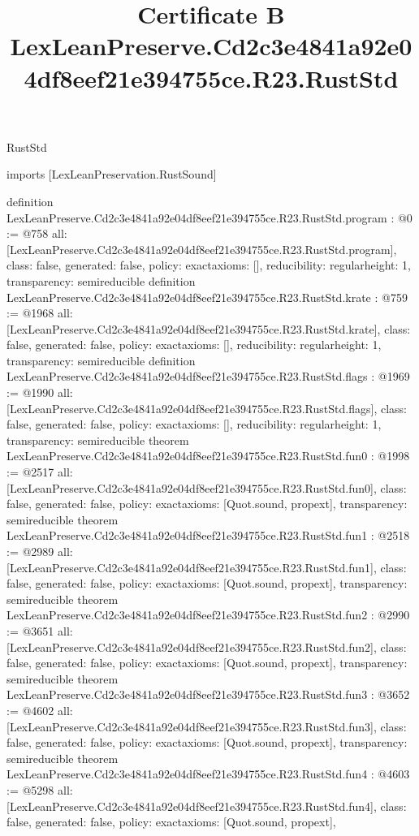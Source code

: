 \begin{lexlean}{RustStd}
\title{Certificate B LexLeanPreserve.Cd2c3e4841a92e04df8eef21e394755ce.R23.RustStd}
\begin{coremodule}
imports [LexLeanPreservation.RustSound]

definition LexLeanPreserve.Cd2c3e4841a92e04df8eef21e394755ce.R23.RustStd.program : @0 := @758 {
  all: [LexLeanPreserve.Cd2c3e4841a92e04df8eef21e394755ce.R23.RustStd.program],
  class: false,
  generated: false,
  policy: exact{axioms: []},
  reducibility: regular{height: 1},
  transparency: semireducible
}
definition LexLeanPreserve.Cd2c3e4841a92e04df8eef21e394755ce.R23.RustStd.krate : @759 := @1968 {
  all: [LexLeanPreserve.Cd2c3e4841a92e04df8eef21e394755ce.R23.RustStd.krate],
  class: false,
  generated: false,
  policy: exact{axioms: []},
  reducibility: regular{height: 1},
  transparency: semireducible
}
definition LexLeanPreserve.Cd2c3e4841a92e04df8eef21e394755ce.R23.RustStd.flags : @1969 := @1990 {
  all: [LexLeanPreserve.Cd2c3e4841a92e04df8eef21e394755ce.R23.RustStd.flags],
  class: false,
  generated: false,
  policy: exact{axioms: []},
  reducibility: regular{height: 1},
  transparency: semireducible
}
theorem LexLeanPreserve.Cd2c3e4841a92e04df8eef21e394755ce.R23.RustStd.fun0 : @1998 := @2517 {
  all: [LexLeanPreserve.Cd2c3e4841a92e04df8eef21e394755ce.R23.RustStd.fun0],
  class: false,
  generated: false,
  policy: exact{axioms: [Quot.sound, propext]},
  transparency: semireducible
}
theorem LexLeanPreserve.Cd2c3e4841a92e04df8eef21e394755ce.R23.RustStd.fun1 : @2518 := @2989 {
  all: [LexLeanPreserve.Cd2c3e4841a92e04df8eef21e394755ce.R23.RustStd.fun1],
  class: false,
  generated: false,
  policy: exact{axioms: [Quot.sound, propext]},
  transparency: semireducible
}
theorem LexLeanPreserve.Cd2c3e4841a92e04df8eef21e394755ce.R23.RustStd.fun2 : @2990 := @3651 {
  all: [LexLeanPreserve.Cd2c3e4841a92e04df8eef21e394755ce.R23.RustStd.fun2],
  class: false,
  generated: false,
  policy: exact{axioms: [Quot.sound, propext]},
  transparency: semireducible
}
theorem LexLeanPreserve.Cd2c3e4841a92e04df8eef21e394755ce.R23.RustStd.fun3 : @3652 := @4602 {
  all: [LexLeanPreserve.Cd2c3e4841a92e04df8eef21e394755ce.R23.RustStd.fun3],
  class: false,
  generated: false,
  policy: exact{axioms: [Quot.sound, propext]},
  transparency: semireducible
}
theorem LexLeanPreserve.Cd2c3e4841a92e04df8eef21e394755ce.R23.RustStd.fun4 : @4603 := @5298 {
  all: [LexLeanPreserve.Cd2c3e4841a92e04df8eef21e394755ce.R23.RustStd.fun4],
  class: false,
  generated: false,
  policy: exact{axioms: [Quot.sound, propext]},
}
\end{coremodule}
\end{lexlean}
